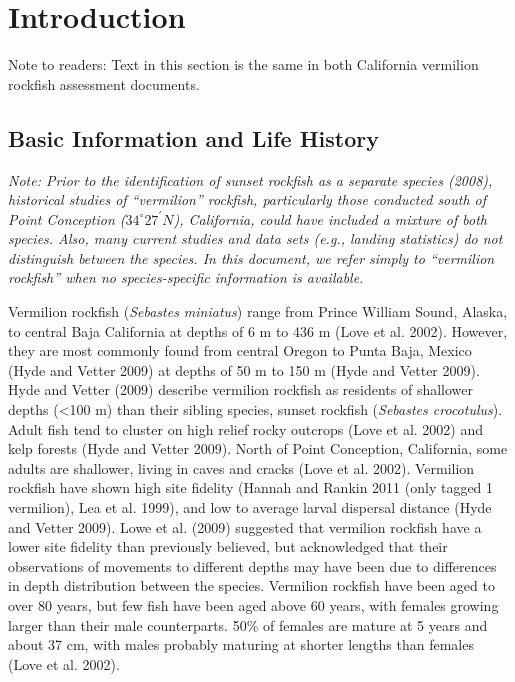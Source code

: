 \documentclass[
  english,
  a4paper,
]{article}
\begin{document}
\pagebreak
\setlength{\parskip}{5mm plus1mm minus1mm}
\setcounter{page}{1}
\renewcommand{\thefigure}{\arabic{figure}}
\renewcommand{\thetable}{\arabic{table}}
\setcounter{table}{0}
\setcounter{figure}{0}

\hypertarget{introduction}{%
\section{Introduction}\label{introduction}}

Note to readers: Text in this section is the same in both California vermilion rockfish assessment
documents.

\hypertarget{basic-information-and-life-history}{%
\subsection{Basic Information and Life History}\label{basic-information-and-life-history}}

\emph{Note: Prior to the identification of sunset rockfish as a separate species (2008), historical studies of ``vermilion'' rockfish, particularly those conducted south of Point Conception ($34^\circ 27^\prime N$), California, could have included a mixture of both species. Also, many current studies and data sets (e.g., landing statistics) do not distinguish between the species. In this document, we refer simply to ``vermilion rockfish'' when no species-specific information is available.}

Vermilion rockfish (\emph{Sebastes miniatus}) range from Prince William Sound, Alaska, to central Baja California at
depths of 6 m to 436 m (Love et al. 2002). However, they are most commonly found from central Oregon
to Punta Baja, Mexico (Hyde and Vetter 2009) at depths of 50 m to 150 m (Hyde and Vetter 2009). Hyde and Vetter
(2009) describe vermilion rockfish as residents of shallower depths (\textless100 m) than their sibling species,
sunset rockfish (\emph{Sebastes crocotulus}). Adult fish tend to cluster on high relief rocky outcrops (Love et al. 2002)
and kelp forests (Hyde and Vetter 2009). North of Point Conception, California, some adults are shallower,
living in caves and cracks (Love et al. 2002). Vermilion rockfish have shown high site fidelity
(Hannah and Rankin 2011 (only tagged 1 vermilion), Lea et al. 1999), and low to average larval dispersal
distance (Hyde and Vetter 2009). Lowe et al. (2009) suggested that vermilion rockfish
have a lower site fidelity than previously believed, but acknowledged that their
observations of movements to different depths may have been due to differences in depth distribution between the species.
Vermilion rockfish have been aged to over 80 years, but few fish have been aged above 60 years, with females growing larger than their male counterparts. 50\% of females are mature at 5 years and about
37 cm, with males probably maturing at shorter lengths than females (Love et al. 2002).
\end{document}
